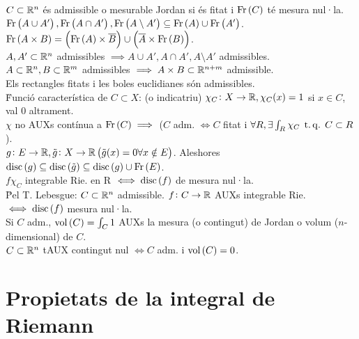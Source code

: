\ci $C\subset\mathbb{R}^n$ és admissible o mesurable Jordan si és fitat i $\operatorname{Fr}\left( C \right)$ té mesura nul·la.\\
\ci $\operatorname{Fr}\left( A \cup A' \right), \operatorname{Fr}\left( A\cap A' \right), \operatorname{Fr}\left( A\setminus A' \right) \subseteq \operatorname{Fr}\left( A \right) \cup \operatorname{Fr}\left( A' \right)$. \\
\ci $\operatorname{Fr}\left( A\times B \right) = \left( \operatorname{Fr}\left( A \right)\times \overline{B} \right) \cup \left( \overline{A} \times \operatorname{Fr}\left( B \right) \right)$.\\
\ci $A,A'\subset\mathbb{R}^n$ admissibles $\implies A\cup A', A\cap A', A\setminus A'$ admissibles. \\
\ci $A\subset\mathbb{R}^n, B\subset\mathbb{R}^m$ admissibles $\implies A\times B \subset \mathbb{R}^{n+m}$ admissible. \\
\ci Els rectangles fitats i les boles euclidianes són admissibles. \\
\u{Funció característica de $C\subset X$}: (o indicatriu) $\chi_C\colon X \to \mathbb{R}, \chi_C(x) = 1$ si $x \in C$, val $0$ altrament.\\
\ci $\chi$ no AUXs contínua a $\operatorname{Fr}\left( C \right) \implies$ ($C$ adm. $\iff C$ fitat i $\forall R, \exists \int_R \chi_C \operatorname{\;t.q.\;} C\subset R$). \\
\ci $g\colon E\to\mathbb{R}, \tilde{g}\colon X\to\mathbb{R} \left( \tilde{g}(x) = 0 \forall x \notin E \right)$. Aleshores $\operatorname{disc}\left( g \right) \subseteq \operatorname{disc}\left( \tilde{g} \right)\subseteq \operatorname{disc}\left( g \right)\cup \operatorname{Fr}\left( E \right)$. \\
\ci $f\chi_C$ integrable Rie. en R $\iff \operatorname{disc}\left( f \right)$ de mesura nul·la. \\
\u{Pel T. Lebesgue}: $C\subset \mathbb{R}^n$ admissible. $f\colon C \to \mathbb{R}$ AUXs integrable Rie. $\iff \operatorname{disc}\left( f \right)$ mesura nul·la. \\
\ci Si $C$ adm., $\operatorname{vol}\left( C \right) = \int_C 1$ AUXs la mesura (o contingut) de Jordan o volum ($n$-dimensional) de $C$. \\
\ci $C\subset\mathbb{R}^n$ tAUX contingut nul $\iff C$ adm. i $\operatorname{vol}\left( C \right) = 0$.

\section{Propietats de la integral de Riemann}

